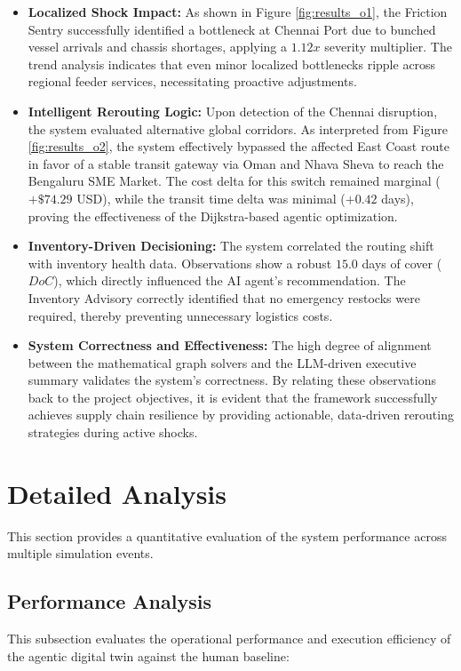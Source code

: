 \begin{itemize}
    \item \textbf{Localized Shock Impact:} As shown in Figure \ref{fig:results_o1}, the Friction Sentry successfully identified a bottleneck at Chennai Port due to bunched vessel arrivals and chassis shortages, applying a $1.12x$ severity multiplier. The trend analysis indicates that even minor localized bottlenecks ripple across regional feeder services, necessitating proactive adjustments.
    \item \textbf{Intelligent Rerouting Logic:} Upon detection of the Chennai disruption, the system evaluated alternative global corridors. As interpreted from Figure \ref{fig:results_o2}, the system effectively bypassed the affected East Coast route in favor of a stable transit gateway via Oman and Nhava Sheva to reach the Bengaluru SME Market. The cost delta for this switch remained marginal ($+\$74.29$ USD), while the transit time delta was minimal ($+0.42$ days), proving the effectiveness of the Dijkstra-based agentic optimization.
    \item \textbf{Inventory-Driven Decisioning:} The system correlated the routing shift with inventory health data. Observations show a robust $15.0$ days of cover ($DoC$), which directly influenced the AI agent's recommendation. The Inventory Advisory correctly identified that no emergency restocks were required, thereby preventing unnecessary logistics costs.
    \item \textbf{System Correctness and Effectiveness:} The high degree of alignment between the mathematical graph solvers and the LLM-driven executive summary validates the system's correctness. By relating these observations back to the project objectives, it is evident that the framework successfully achieves supply chain resilience by providing actionable, data-driven rerouting strategies during active shocks.
\end{itemize}

\section[Detailed Analysis]{Detailed Analysis}
This section provides a quantitative evaluation of the system performance across multiple simulation events.

\subsection[Performance Analysis]{Performance Analysis}
This subsection evaluates the operational performance and execution efficiency of the agentic digital twin against the human baseline:

